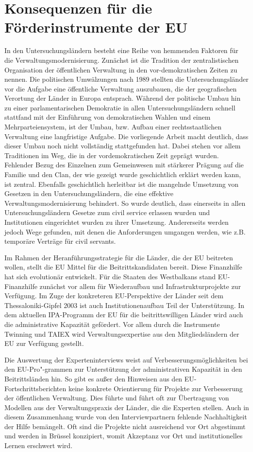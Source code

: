 \section{Konsequenzen für die Förderinstrumente der EU}
In den Untersuchungsländern besteht eine Reihe von hemmenden Faktoren für die Verwaltungsmodernisierung. Zunächst ist die Tradition der zentralistischen Organisation der öffentlichen Verwaltung in den vor-demokratischen Zeiten zu nennen. Die politischen Umwälzungen nach 1989 stellten die Untersuchungsländer vor die Aufgabe eine öffentliche Verwaltung auszubauen, die der geografischen Verortung der Länder in Europa entsprach. Während der politische Umbau hin zu einer parlamentarischen Demokratie in allen Untersuchungsländern schnell stattfand mit der Einführung von demokratischen Wahlen und einem Mehrparteiensystem, ist der Umbau, bzw. Aufbau einer rechtsstaatlichen Verwaltung eine langfristige Aufgabe. Die vorliegende Arbeit macht deutlich, dass dieser Umbau noch nicht vollständig stattgefunden hat. Dabei stehen vor allem Traditionen im Weg, die in der vordemokratischen Zeit geprägt wurden. Fehlender Bezug des Einzelnen zum Gemeinwesen mit stärkerer Prägung auf die Familie und den Clan, der wie gezeigt wurde geschichtlich erklärt werden kann, ist zentral. Ebenfalls geschichtlich herleitbar ist die mangelnde Umsetzung von Gesetzen in den Untersuchungsländern, die eine effektive Verwaltungsmodernisierung behindert. So wurde deutlich, dass einerseits in allen Untersuchungsländern Gesetze zum civil service erlassen wurden und Institutionen eingerichtet wurden zu ihrer Umsetzung. Andererseits werden jedoch Wege gefunden, mit denen die Anforderungen umgangen werden, wie z.B. temporäre Verträge für civil servants.\par
Im Rahmen der Heranführungsstrategie für die Länder, die der EU beitreten wollen, stellt die EU Mittel für die Beitrittskandidaten bereit. Diese Finanzhilfe hat sich evolutionär entwickelt. Für die Staaten des Westbalkans stand EU-Finanzhilfe zunächst vor allem für Wiederaufbau und Infrastrukturprojekte zur Verfügung. Im Zuge der konkreteren EU-Perspektive der Länder seit dem Thessaloniki-Gipfel 2003 ist auch Institutionenaufbau Teil der Unterstützung. In dem aktuellen IPA-Programm der EU für die beitrittswilligen Länder wird auch die administrative Kapazität gefördert. Vor allem durch die Instrumente Twinning und TAIEX wird Verwaltungsexpertise aus den Mitgliedsländern der EU zur Verfügung gestellt.\par
Die Auswertung der Experteninterviews weist auf Verbesserungsmöglichkeiten bei den EU-Pro"-grammen zur Unterstützung der administrativen Kapazität in den Beitrittsländen hin. So gibt es außer den Hinweisen aus den EU-Fortschrittsberichten keine konkrete Orientierung für Projekte zur Verbesserung der öffentlichen Verwaltung. Dies führte und führt oft zur Übertragung von Modellen aus der Verwaltungspraxis der Länder, die die Experten stellen. Auch in diesem Zusammenhang wurde von den Interviewpartnern fehlende Nachhaltigkeit der Hilfe bemängelt. Oft sind die Projekte nicht ausreichend vor Ort abgestimmt und werden in Brüssel konzipiert, womit Akzeptanz vor Ort und institutionelles Lernen erschwert wird.\par

